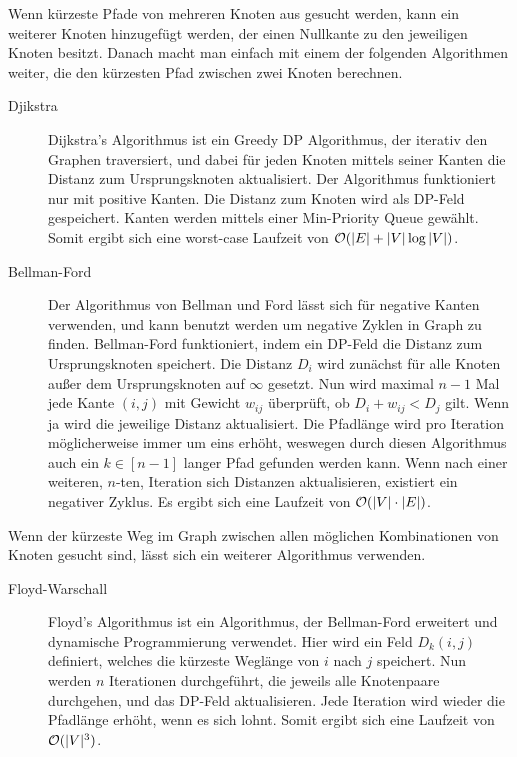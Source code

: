 Wenn kürzeste Pfade von mehreren Knoten aus gesucht werden, kann ein weiterer Knoten hinzugefügt werden, der einen Nullkante zu den jeweiligen Knoten besitzt.
Danach macht man einfach mit einem der folgenden Algorithmen weiter, die den kürzesten Pfad zwischen zwei Knoten berechnen.
\begin{description}
    \item[Djikstra] Dijkstra's Algorithmus ist ein Greedy DP Algorithmus, der iterativ den Graphen traversiert, und dabei für jeden Knoten mittels seiner Kanten die Distanz zum Ursprungsknoten aktualisiert.
        Der Algorithmus funktioniert nur mit positive Kanten.
        Die Distanz zum Knoten wird als DP-Feld gespeichert.
        Kanten werden mittels einer Min-Priority Queue gewählt.
        Somit ergibt sich eine worst-case Laufzeit von \(\mathcal O(|E| + |V| \log |V|)\).

    \item[Bellman-Ford] Der Algorithmus von Bellman und Ford lässt sich für negative Kanten verwenden, und kann benutzt werden um negative Zyklen in Graph zu finden.
        Bellman-Ford funktioniert, indem ein DP-Feld die Distanz zum Ursprungsknoten speichert.
        Die Distanz \(D_i\) wird zunächst für alle Knoten außer dem Ursprungsknoten auf \(\infty\) gesetzt.
        Nun wird maximal \(n-1\) Mal jede Kante \((i, j)\) mit Gewicht \(w_{ij}\) überprüft, ob \(D_i + w_{ij} < D_j\) gilt.
        Wenn ja wird die jeweilige Distanz aktualisiert.
        Die Pfadlänge wird pro Iteration möglicherweise immer um eins erhöht, weswegen durch diesen Algorithmus auch ein \(k \in [n-1]\) langer Pfad gefunden werden kann.
        Wenn nach einer weiteren, \(n\)-ten, Iteration sich Distanzen aktualisieren, existiert ein negativer Zyklus.
        Es ergibt sich eine Laufzeit von \(\mathcal O(|V| \cdot |E|)\).
\end{description}
Wenn der kürzeste Weg im Graph zwischen allen möglichen Kombinationen von Knoten gesucht sind, lässt sich ein weiterer Algorithmus verwenden.
\begin{description}
    \item[Floyd-Warschall] Floyd's Algorithmus ist ein Algorithmus, der Bellman-Ford erweitert und dynamische Programmierung verwendet.
        Hier wird ein Feld \(D_k(i,j)\) definiert, welches die kürzeste Weglänge von \(i\) nach \(j\) speichert.
        Nun werden \(n\) Iterationen durchgeführt, die jeweils alle Knotenpaare durchgehen, und das DP-Feld aktualisieren.
        Jede Iteration wird wieder die Pfadlänge erhöht, wenn es sich lohnt.
        Somit ergibt sich eine Laufzeit von \(\mathcal O(|V|^3)\).
\end{description}

